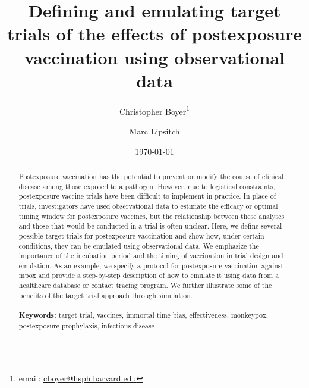 \documentclass[11pt]{article}
\begin{document}
\begin{titlepage}
\title{Defining and emulating target trials of the effects of postexposure vaccination using observational data}
\author[1]{Christopher Boyer\thanks{email: \href{mailto:cboyer@hsph.harvard.edu}{cboyer@hsph.harvard.edu}}}
\author[1]{Marc Lipsitch}
\date{\today}
\maketitle

\begin{abstract}
Postexposure vaccination has the potential to prevent or modify the course of clinical disease among those exposed to a pathogen. However, due to logistical constraints, postexposure vaccine trials have been difficult to implement in practice. In place of trials, investigators have used observational data to estimate the efficacy or optimal timing window for postexposure vaccines, but the relationship between these analyses and those that would be conducted in a trial is often unclear. Here, we define several possible target trials for postexposure vaccination and show how, under certain conditions, they can be emulated using observational data. We emphasize the importance of the incubation period and the timing of vaccination in trial design and emulation. As an example, we specify a protocol for postexposure vaccination against mpox and provide a step-by-step description of how to emulate it using data from a healthcare database or contact tracing program. We further illustrate some of the benefits of the target trial approach through simulation.
\noindent \\
\vspace{0in} \\
\noindent\textbf{Keywords:} target trial, vaccines, immortal time bias, effectiveness, monkeypox, postexposure prophylaxis, infectious disease \\

\bigskip
\end{abstract}
\setcounter{page}{0}
\thispagestyle{empty}
\end{titlepage}
\pagebreak \newpage
\doublespacing
\end{document}
